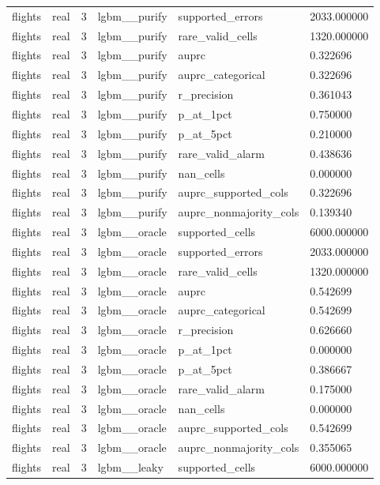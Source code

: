 \begin{tabular}{llllll}
flights & real & 3 & lgbm\_\_purify & supported\_errors & 2033.000000 \\
flights & real & 3 & lgbm\_\_purify & rare\_valid\_cells & 1320.000000 \\
flights & real & 3 & lgbm\_\_purify & auprc & 0.322696 \\
flights & real & 3 & lgbm\_\_purify & auprc\_categorical & 0.322696 \\
flights & real & 3 & lgbm\_\_purify & r\_precision & 0.361043 \\
flights & real & 3 & lgbm\_\_purify & p\_at\_1pct & 0.750000 \\
flights & real & 3 & lgbm\_\_purify & p\_at\_5pct & 0.210000 \\
flights & real & 3 & lgbm\_\_purify & rare\_valid\_alarm & 0.438636 \\
flights & real & 3 & lgbm\_\_purify & nan\_cells & 0.000000 \\
flights & real & 3 & lgbm\_\_purify & auprc\_supported\_cols & 0.322696 \\
flights & real & 3 & lgbm\_\_purify & auprc\_nonmajority\_cols & 0.139340 \\
flights & real & 3 & lgbm\_\_oracle & supported\_cells & 6000.000000 \\
flights & real & 3 & lgbm\_\_oracle & supported\_errors & 2033.000000 \\
flights & real & 3 & lgbm\_\_oracle & rare\_valid\_cells & 1320.000000 \\
flights & real & 3 & lgbm\_\_oracle & auprc & 0.542699 \\
flights & real & 3 & lgbm\_\_oracle & auprc\_categorical & 0.542699 \\
flights & real & 3 & lgbm\_\_oracle & r\_precision & 0.626660 \\
flights & real & 3 & lgbm\_\_oracle & p\_at\_1pct & 0.000000 \\
flights & real & 3 & lgbm\_\_oracle & p\_at\_5pct & 0.386667 \\
flights & real & 3 & lgbm\_\_oracle & rare\_valid\_alarm & 0.175000 \\
flights & real & 3 & lgbm\_\_oracle & nan\_cells & 0.000000 \\
flights & real & 3 & lgbm\_\_oracle & auprc\_supported\_cols & 0.542699 \\
flights & real & 3 & lgbm\_\_oracle & auprc\_nonmajority\_cols & 0.355065 \\
flights & real & 3 & lgbm\_\_leaky & supported\_cells & 6000.000000 \\

\end{tabular}
